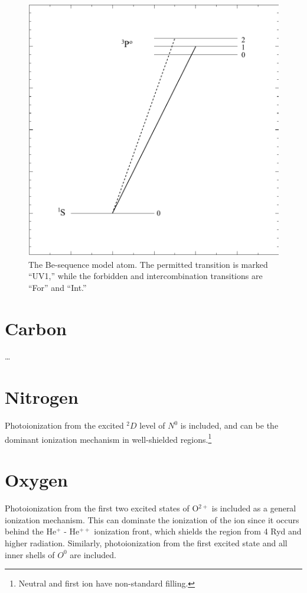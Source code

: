 \begin{figure}
\centering
\includegraphics[scale=0.6]{BeSequenceEnergyLevels}
\caption[Be-sequence model atom]{The Be-sequence model atom.  The permitted transition is marked
``UV1,'' while the forbidden and intercombination transitions are ``For''
and ``Int.''}
\label{fig:BeSequenceEnergyLevels}
\end{figure}

\section{Carbon}

\dots

\section{Nitrogen}

Photoionization from the excited $^2D$
level of $N^0$ is included, and can be the dominant ionization mechanism in
well-shielded regions.\footnote{Neutral and first ion have non-standard filling.}

\section{Oxygen}

Photoionization from the first two excited states of O$^{2+}$ is included
as a general ionization mechanism.  This can dominate the ionization of
the ion since it occurs behind the He$^+$ - He$^{++}$ ionization front, which shields
the region from 4 Ryd and higher radiation.   Similarly, photoionization
from the first excited state and all inner shells of $O^0$ are included.

